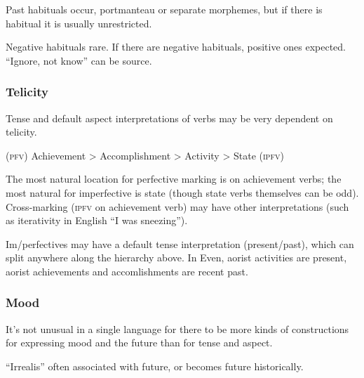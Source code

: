 \documentclass[11pt]{article}
\newcommand{\I}[1]{\textsc{#1}}   %
\begin{document}
Past habituals occur, portmanteau or separate morphemes, but if there
is habitual it is usually unrestricted.

Negative habituals rare.  If there are negative habituals, positive
ones expected.  ``Ignore, not know'' can be source.

\subsubsection{Telicity}
Tense and default aspect interpretations of verbs may be very
dependent on telicity.
\begin{center}
  \I{(pfv)} Achievement > Accomplishment > Activity > State \I{(ipfv)}
\end{center}
\noindent The most natural location for perfective marking is on
achievement verbs; the most natural for imperfective is state (though
state verbs themselves can be odd).  Cross-marking (\I{ipfv} on
achievement verb) may have other interpretations (such as iterativity
in English ``I was sneezing'').

Im/perfectives may have a default tense interpretation (present/past),
which can split anywhere along the hierarchy above.  In Even, aorist
activities are present, aorist achievements and accomlishments are
recent past.

\subsubsection{Mood}
It's not unusual in a single language for there to be more kinds of
constructions for expressing mood and the future than for tense and
aspect.

``Irrealis'' often associated with future, or becomes future
historically. 
\end{document}
